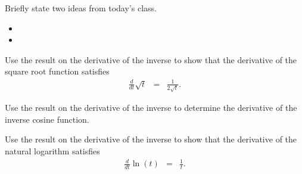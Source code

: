 \begin{problem}
\item Briefly state two ideas from today's class.
  \begin{itemize}
  \item 
  \item 
  \end{itemize}

\item Use the result on the derivative of the inverse to show that the
  derivative of the square root function satisfies
  \begin{eqnarray*}
    \frac{d}{dt} \sqrt{t} & = & \frac{1}{2\sqrt{t}}.
  \end{eqnarray*}

  \vfill

\item Use the result on the derivative of the inverse to determine the
  derivative of the inverse cosine function.
  \vfill

\item Use the result on the derivative of the inverse to show that the
  derivative of the natural logarithm satisfies
  \begin{eqnarray*}
    \frac{d}{dt} \ln(t) & = & \frac{1}{t}.
  \end{eqnarray*}

  \vfill


\end{problem}




